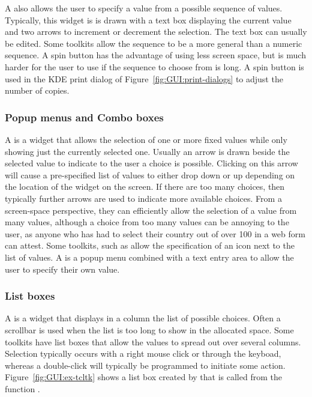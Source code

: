 A  also allows the user to specify a value from a possible
sequence of values. Typically, this widget is is drawn with a text box
displaying the current value and two arrows to increment or decrement
the selection. The text box can usually be edited. Some toolkits allow
the sequence to be a more general than a numeric sequence. A spin
button has the advantage of using less screen space, but is much
harder for the user to use if the sequence to choose from is long. A
spin button is used in the KDE print dialog of
Figure~\ref{fig:GUI:print-dialogs} to adjust the number of copies.


\subsubsection{Popup menus and Combo boxes}
\label{sec:GUI:combo-boxes}

A  is a widget that allows the selection of one or more
fixed values while only showing just the currently selected one.
Usually an arrow is drawn beside the selected value to indicate to the
user a choice is possible. Clicking on this arrow will cause a
pre-specified list of values to either drop down or up depending on
the location of the widget on the screen. If there are too many
choices, then typically further arrows are used to indicate more
available choices.  From a screen-space perspective, they can
efficiently allow the selection of a value from many values, although
a choice from too many values can be annoying to the user, as anyone
who has had to select their country out of over 100 in a web form can
attest. Some toolkits, such as \GTK\/ allow the specification of an
icon next to the list of values. A  is a popup menu
combined with a text entry area to allow the user to specify their own
value.







\subsubsection{List boxes}

A  is a widget that displays in a column the list of
possible choices. Often a scrollbar is used when the list is too long
to show in the allocated space. Some toolkits have list boxes that
allow the values to spread out over several columns. Selection
typically occurs with a right mouse click or through the keyboad,
whereas a double-click will typically be programmed to initiate some
action. Figure~\ref{fig:GUI:ex-tcltk} shows a list box created by \R\/
that is called from the function .


